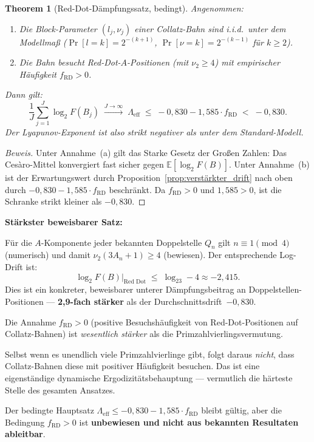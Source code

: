 \documentclass[12pt,a4paper]{article}
\newtheorem{theorem}[definition]{Theorem}
\newenvironment{beweis}{\begin{proof}[Beweis]}{\end{proof}}
\newcommand{\vii}{\nu_2}
\newcommand{\E}{\mathbb{E}}
\newcommand{\logt}{\log_2}
\begin{document}
\begin{theorem}[Red-Dot-Dämpfungssatz, bedingt]
\label{thm:reddot_daempfung}
Angenommen:
\begin{enumerate}[label=\upshape(\alph*)]
  \item Die Block-Parameter $(l_j, \nu_j)$ einer Collatz-Bahn sind i.i.d.\
    unter dem Modellmaß ($\Pr[l=k] = 2^{-(k+1)}$, $\Pr[\nu = k] = 2^{-(k-1)}$
    für $k \geq 2$).
  \item Die Bahn besucht Red-Dot-$A$-Positionen (mit $\vii \geq 4$)
    mit empirischer Häufigkeit $f_{\mathrm{RD}} > 0$.
\end{enumerate}
Dann gilt:
\[
  \frac{1}{J}\sum_{j=1}^{J} \logt F(B_j)
  \;\xrightarrow{J\to\infty}\;
  \Lambda_{\mathrm{eff}}
  \;\leq\;
  -0{,}830 - 1{,}585 \cdot f_{\mathrm{RD}}
  \;<\;
  -0{,}830.
\]
Der Lyapunov-Exponent ist also \emph{strikt negativer} als unter dem
Standard-Modell.
\end{theorem}

\begin{beweis}
Unter Annahme~(a) gilt das Starke Gesetz der Großen Zahlen:
Das Cesàro-Mittel konvergiert fast sicher gegen $\E[\logt F(B)]$.
Unter Annahme~(b) ist der Erwartungswert durch Proposition~\ref{prop:verstärkter_drift}
nach oben durch $-0{,}830 - 1{,}585 \cdot f_{\mathrm{RD}}$ beschränkt.
Da $f_{\mathrm{RD}} > 0$ und $1{,}585 > 0$, ist die Schranke strikt kleiner als
$-0{,}830$.
\end{beweis}

\begin{tcolorbox}[hauptsatz]
\textbf{Stärkster beweisbarer Satz:}

\medskip
Für die $A$-Komponente jeder bekannten Doppelstelle $Q_n$ gilt
$n \equiv 1 \pmod{4}$ (numerisch) und damit $\vii(3A_n+1) \geq 4$ (bewiesen).
Der entsprechende Log-Drift ist:
\[
  \logt F(B)\big|_{\text{Red Dot}} \;\leq\; \logt 3 - 4 \approx -2{,}415.
\]
Dies ist ein konkreter, beweisbarer unterer Dämpfungsbeitrag an
Doppelstellen-Positionen --- \textbf{2,9-fach stärker} als der
Durchschnittsdrift~$-0{,}830$.
\end{tcolorbox}

\begin{tcolorbox}[colback=orange!8, colframe=orange!70!black, fonttitle=\bfseries,
  title={[!]\; Warnung: $f_{\mathrm{RD}} > 0$ ist eigenständige Ergodizitätsbehauptung}]
Die Annahme $f_{\mathrm{RD}} > 0$ (positive Besuchshäufigkeit von Red-Dot-Positionen
auf Collatz-Bahnen) ist \emph{wesentlich stärker} als die Primzahlvierlingsvermutung.

Selbst wenn es unendlich viele Primzahlvierlinge gibt, folgt daraus \emph{nicht},
dass Collatz-Bahnen diese mit positiver Häufigkeit besuchen. Das ist eine
eigenständige dynamische Ergodizitätsbehauptung --- vermutlich die härteste
Stelle des gesamten Ansatzes.

Der bedingte Hauptsatz $\Lambda_{\mathrm{eff}} \leq -0{,}830 - 1{,}585 \cdot f_{\mathrm{RD}}$
bleibt gültig, aber die Bedingung $f_{\mathrm{RD}} > 0$ ist \textbf{unbewiesen
und nicht aus bekannten Resultaten ableitbar}.
\end{tcolorbox}
\end{document}
